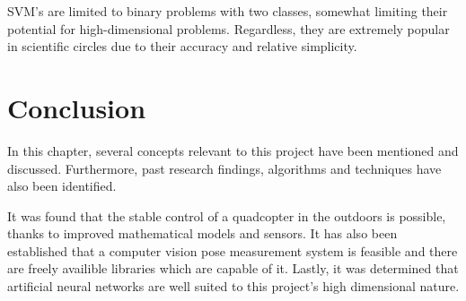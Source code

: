 SVM's are limited to  binary problems with two classes, somewhat limiting their potential for high-dimensional problems. Regardless, they are extremely popular in scientific circles due to their accuracy and relative simplicity. 

\section{Conclusion}

In this chapter, several concepts relevant to this project have been mentioned and discussed. Furthermore, past research findings, algorithms and techniques have also been identified. 

It was found that the stable control of a quadcopter in the outdoors is possible, thanks to improved mathematical models and sensors. It has also been established that a computer vision pose measurement system is feasible and there are freely availible libraries which are capable of it. Lastly, it was determined that artificial neural networks are well suited to this project's high dimensional nature. 

